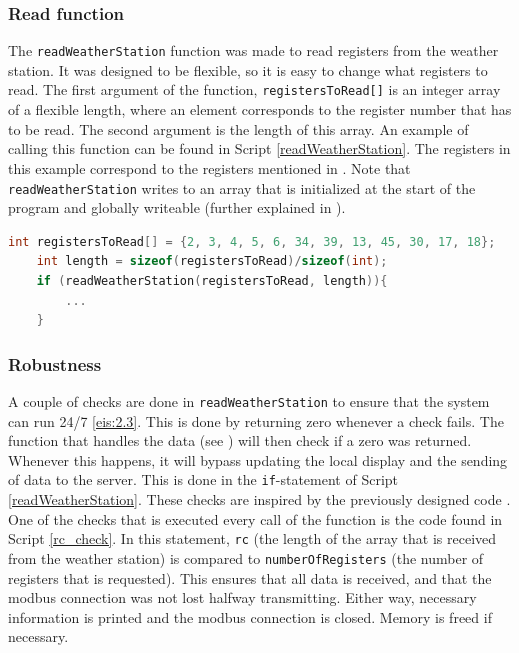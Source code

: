 \subsubsection{Read function}
The \verb|readWeatherStation| function was made to read registers from the weather station. It was designed to be flexible, so it is easy to change what registers to read. The first argument of the function, \verb|registersToRead[]| is an integer array of a flexible length, where an element corresponds to the register number that has to be read. The second argument is the length of this array. An example of calling this function can be found in Script \ref{readWeatherStation}. The registers in this example correspond to the registers mentioned in . Note that \verb|readWeatherStation| writes to an array that is initialized at the start of the program and globally writeable (further explained in ).\\

\scriptsize
\begin{lstlisting}[language=C,caption={Read function},label={readWeatherStation}]
	int registersToRead[] = {2, 3, 4, 5, 6, 34, 39, 13, 45, 30, 17, 18};
	int length = sizeof(registersToRead)/sizeof(int);
	if (readWeatherStation(registersToRead, length)){
		...
	}
\end{lstlisting}
\normalsize

\subsubsection{Robustness}\label{sec:weather_robustness}
A couple of checks are done in \verb|readWeatherStation| to ensure that the system can run 24/7 \ref{eis:2.3}. This is done by returning zero whenever a check fails. The function that handles the data (see ) will then check if a zero was returned. Whenever this happens, it will bypass updating the local display and the sending of data to the server. This is done in the \verb|if|-statement of Script \ref{readWeatherStation}. These checks are inspired by the previously designed code \cite{report_pavel}.\\

One of the checks that is executed every call of the function is the code found in Script \ref{rc_check}. In this statement, \verb|rc| (the length of the array that is received from the weather station) is compared to \verb|numberOfRegisters| (the number of registers that is requested). This ensures that all data is received, and that the modbus connection was not lost halfway transmitting. Either way, necessary information is printed and the modbus connection is closed. Memory is freed if necessary.\\

